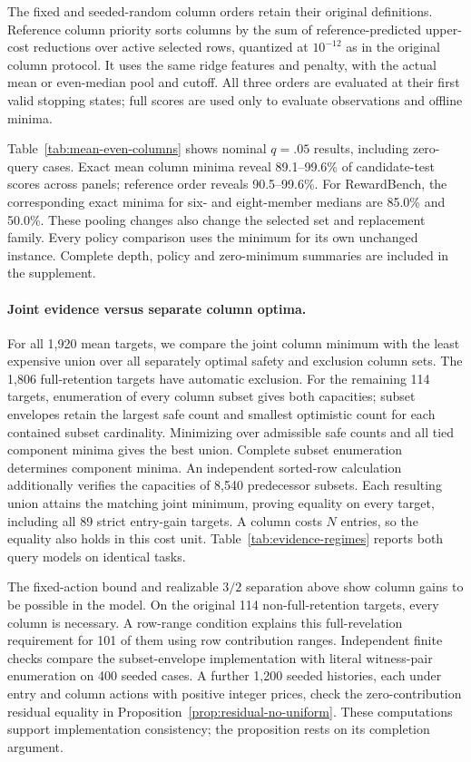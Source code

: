 The fixed and seeded-random column orders retain their original definitions. Reference column priority sorts columns by the sum of reference-predicted upper-cost reductions over active selected rows, quantized at $10^{-12}$ as in the original column protocol. It uses the same ridge features and penalty, with the actual mean or even-median pool and cutoff. All three orders are evaluated at their first valid stopping states; full scores are used only to evaluate observations and offline minima.

Table~\ref{tab:mean-even-columns} shows nominal $q=.05$ results, including zero-query cases. Exact mean column minima reveal 89.1--99.6\% of candidate-test scores across panels; reference order reveals 90.5--99.6\%. For RewardBench, the corresponding exact minima for six- and eight-member medians are 85.0\% and 50.0\%. These pooling changes also change the selected set and replacement family. Every policy comparison uses the minimum for its own unchanged instance. Complete depth, policy and zero-minimum summaries are included in the supplement.


\paragraph{Joint evidence versus separate column optima.}
For all 1,920 mean targets, we compare the joint column minimum with the least expensive union over all separately optimal safety and exclusion column sets. The 1,806 full-retention targets have automatic exclusion. For the remaining 114 targets, enumeration of every column subset gives both capacities; subset envelopes retain the largest safe count and smallest optimistic count for each contained subset cardinality. Minimizing over admissible safe counts and all tied component minima gives the best union. Complete subset enumeration determines component minima. An independent sorted-row calculation additionally verifies the capacities of 8,540 predecessor subsets. Each resulting union attains the matching joint minimum, proving equality on every target, including all 89 strict entry-gain targets. A column costs $N$ entries, so the equality also holds in this cost unit. Table~\ref{tab:evidence-regimes} reports both query models on identical tasks.


The fixed-action bound and realizable $3/2$ separation above show column gains to be possible in the model. On the original 114 non-full-retention targets, every column is necessary. A row-range condition explains this full-revelation requirement for 101 of them using row contribution ranges. Independent finite checks compare the subset-envelope implementation with literal witness-pair enumeration on 400 seeded cases. A further 1,200 seeded histories, each under entry and column actions with positive integer prices, check the zero-contribution residual equality in Proposition~\ref{prop:residual-no-uniform}. These computations support implementation consistency; the proposition rests on its completion argument.


